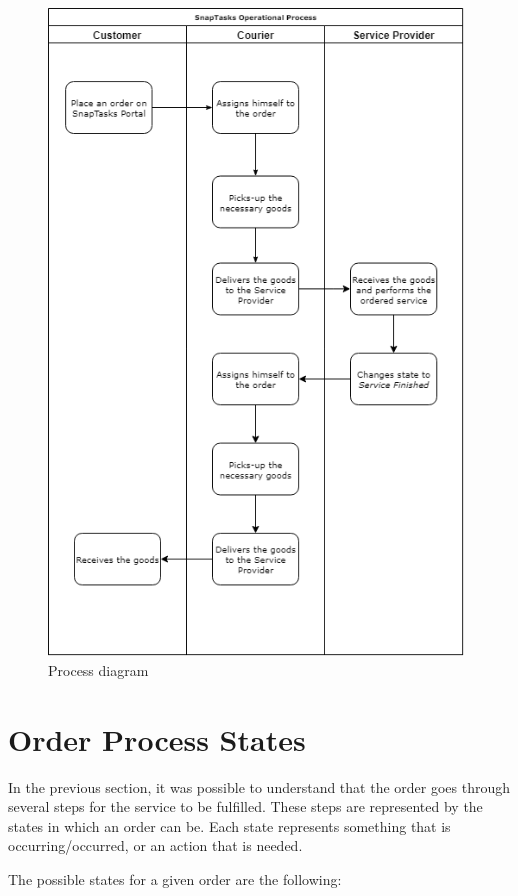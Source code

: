 \begin{figure}[ht]
\centering
\includegraphics[width=0.98\textwidth,keepaspectratio]{chapters/Requirements_Engineering/assets/ProcessDiagram.png}
\caption[Process diagram]{Process diagram}
\label{fig:processDiagram}
\end{figure}

\clearpage

\section{Order Process States}
\label{sub:order-states}

In the previous section, it was possible to understand that the order goes through several steps for the service to be fulfilled. These steps are represented by the states in which an order can be.
Each state represents something that is occurring/occurred, or an action that is needed.
\par
The possible states for a given order are the following:

